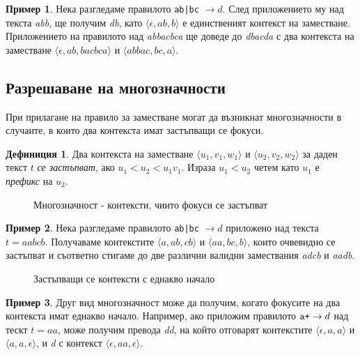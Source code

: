 \documentclass[12pt, oneside]{article}
\theoremstyle{definition}
\newtheorem{definition}{Дефиниция}[section]
\newtheorem{example}{Пример}[section]
\begin{document}
\begin{example}
	Нека разгледаме правилото \verb/ab|bc/ \( \to d \). След приложението му над текста \emph{abb}, ще получим \emph{db}, като \( \langle \epsilon, ab, b \rangle \) е единственият контекст на заместване. Приложението на правилото над \emph{abbacbca} ще доведе до \emph{dbacda} с два контекста на заместване \( \langle \epsilon, ab, bacbca \rangle \) и \( \langle abbac, bc, a \rangle \).
\end{example}

\subsection{Разрешаване на многозначности}

При прилагане на правило за заместване могат да възникнат многозначности в случаите, в които два контекста имат застъпващи се фокуси.

\begin{definition}
	Два контекста на заместване \( \langle u_1,v_1,w_1 \rangle \) и \( \langle u_2,v_2,w_2 \rangle \) за даден текст \( t \) \emph{се застъпват}, ако \( u_1 < u_2 < u_1v_1 \). Израза \( u_1 < u_2 \) четем като \( u_1 \) е \emph{префикс} на \( u_2 \).
\end{definition}

\begin{figure}[!htb]
	\centering
	
	\caption{Многозначност - контексти, чиито фокуси се застъпват}
\end{figure}

\begin{example}
	Нека разгледаме правилото \verb/ab|bc/ \( \to d \) приложено над текста \( t = aabcb \). Получаваме контекстите \( \langle a, ab, cb \rangle \) и \( \langle aa, bc, b \rangle \), които очвевидно се застъпват и съответно стигаме до две различни валидни замествания \emph{adcb} и \emph{aadb}.
\end{example}

\begin{figure}[!htb]
	\centering
	
	\caption{Застъпващи се контексти с еднакво начало}
\end{figure}

\begin{example}
	Друг вид многозначност може да получим, когато фокусите на два контекста имат еднакво начало. Например, ако приложим правилото \( \verb/a+/ \to d \) над тескт \( t = aa \), може получим превода \emph{dd}, на който отговарят контекстите \( \langle \epsilon, a, a \rangle \) и \( \langle a, a, \epsilon \rangle \), и \emph{d} с контекст \( \langle \epsilon, aa, \epsilon \rangle \).
\end{example}
\end{document}
